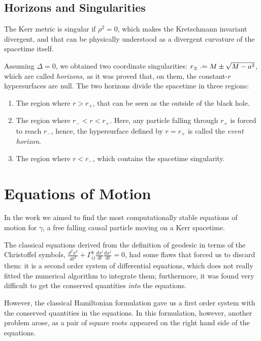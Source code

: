 \subsection{Horizons and Singularities}

The Kerr metric is singular if $\rho^2 = 0$, which makes the Kretschmann invariant divergent, and that can be physically understood as a divergent curvature of the spacetime itself.

Assuming $\Delta = 0$, we obtained two coordinate singularities: $r_{\pm} \defeq M \pm \sqrt{M - a^2}$, which are called \emph{horizons}, as it was proved that, on them, the constant-$r$ hypersurfaces are null. The two horizons divide the spacetime in three regions:
\begin{enumerate}
	\item The region where $r > r_+$, that can be seen as the outside of the black hole.
	\item The region where $r_- < r < r_+$. Here, any particle falling through $r_+$ is forced to reach $r_-$, hence, the hypersurface defined by $r = r_+$ is called the \emph{event horizon}.
	\item The region where $r < r_-$, which contains the spacetime singularity.
\end{enumerate}











\section{Equations of Motion}
\label{chapter:equations}

In the work we aimed to find the most computationally stable equations of motion for $\gamma$, a free falling causal particle moving on a Kerr spacetime.

The classical equations derived from the definition of geodesic in terms of the Christoffel symbols, $\frac{d^2x^k}{dt^2} + \Gamma^k_{ij} \frac{d x^i}{dt} \frac{d x^j}{dt} = 0$, had some flaws that forced us to discard them: it is a second order system of differential equations, which does not really fitted the numerical algorithm to integrate them; furthermore, it was found very difficult to get the conserved quantities \emph{into} the equations.

However, the classical Hamiltonian formulation \cite[Sec. 33.5]{thorne73} gave us a first order system with the conserved quantities in the equations. In this formulation, however, another problem arose, as a pair of square roots appeared on the right hand side of the equations.

